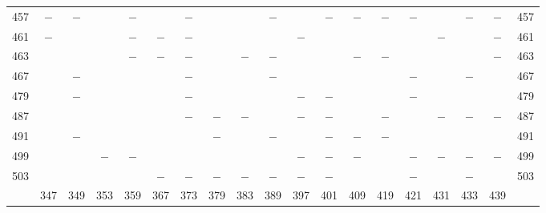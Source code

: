 \begin{center}
\begin{tabular}{r|c|c|c|c|c|c|c|c|c|c|c|c|c|c|c|c|c|r}
457 & $-$ & $-$ &  & $-$ &  & $-$ &  &  & $-$ &  & $-$ & $-$ & $-$ & $-$ &  & $-$ & $-$ & 457\\
461 & $-$ &  &  & $-$ & $-$ & $-$ &  &  &  & $-$ &  &  &  &  & $-$ &  & $-$ & 461\\
463 &  &  &  & $-$ & $-$ & $-$ &  & $-$ & $-$ &  &  & $-$ & $-$ &  &  &  & $-$ & 463\\
467 &  & $-$ &  &  &  & $-$ &  &  & $-$ &  &  &  &  & $-$ &  & $-$ &  & 467\\
479 &  & $-$ &  &  &  & $-$ &  &  &  & $-$ & $-$ &  &  & $-$ &  &  &  & 479\\
487 &  &  &  &  &  & $-$ & $-$ & $-$ &  & $-$ & $-$ &  & $-$ &  & $-$ & $-$ & $-$ & 487\\
491 &  & $-$ &  &  &  &  & $-$ &  & $-$ &  & $-$ & $-$ & $-$ &  &  &  &  & 491\\
499 &  &  & $-$ & $-$ &  &  &  &  &  & $-$ & $-$ & $-$ &  & $-$ & $-$ & $-$ & $-$ & 499\\
503 &  &  &  &  & $-$ & $-$ & $-$ & $-$ & $-$ & $-$ & $-$ &  &  & $-$ &  & $-$ &  & 503\\
\hline
 & 347 & 349 & 353 & 359 & 367 & 373 & 379 & 383 & 389 & 397 & 401 & 409 & 419 & 421 & 431 & 433 & 439 & \\
\hline
\end{tabular}\endgroup\end{center}
\clearpage
